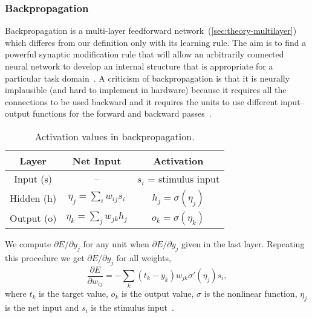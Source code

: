 \subsubsection{Backpropagation}
\label{sec:models-bp} 

Backpropagation is a multi-layer feedforward network~(\ref{sec:theory-multilayer}) which differes from our definition only with its learning rule. The aim is to find a powerful synaptic modification rule that will allow an arbitrarily connected neural network to develop an internal structure that is appropriate for a particular task domain~\citep{rumelhart1986learning}. A criticism of backpropagation is that it is neurally implausible (and hard to implement in hardware) because it requires all the connections to be used backward and it requires the units to use different input--output functions for the forward and backward passes~\citep{hinton1988learning}.

\begin{table}[H] 
  \centering
  \begin{tabular}{|ccc|}
    \hline
    Layer & Net Input & Activation\\
    \hline
    Input (s)  & -- & $s_i$ = stimulus input\\
    \hline
    Hidden (h) & \hspace{0.3cm} $\eta_j = \sum_i w_{ij}s_i$ \hspace{0.3cm} &
    $h_j = \sigma(\eta_j)$\hspace{0.3cm}\\
    \hline
    Output (o) & \hspace{0.3cm} $\eta_k = \sum_j w_{jk}h_j$ \hspace{0.3cm} & 
    $o_k = \sigma(\eta_k)$\hspace{0.3cm}\\
    \hline
  \end{tabular}
  \caption{Activation values in backpropagation.}
  \label{tab:models-bp}
\end{table}

We compute $\partial E / \partial y_j$ for any unit when $\partial E / \partial y_j$ given in the last layer. Repeating this procedure we get $\partial E / \partial y_j$ for all weights, 
\begin{equation} 
\frac{\partial E}{\partial w_{ij}} = -\sum_k(t_k-y_k)w_{jk}\sigma'(\eta_j)s_i,
\end{equation}
where $t_k$ is the target value, $o_k$ is the output value, $\sigma$ is the nonlinear function, $\eta_j$ is the net input and $s_i$ is the stimulus input~\citep{o1996bio}.


